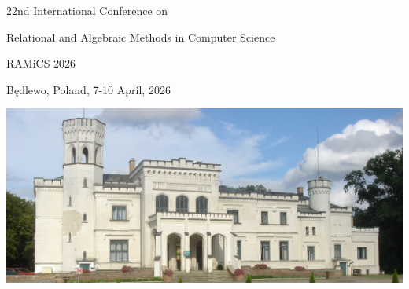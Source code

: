 \documentclass[a3paper, 12pt]{article}
\begin{document}
\begin{center}
  {\Huge 22nd International Conference on}

  \medskip

  {\Huge Relational and Algebraic Methods in Computer Science}

  \bigskip

  {\fontsize{36}{50}\selectfont RAMiCS 2026}

  \bigskip

  {\Huge Będlewo, Poland, 7-10 April, 2026}

  \bigskip

  \includegraphics[width=.7\linewidth]{figs/bedlewo-c}

  \medskip
\end{center}
\end{document}

